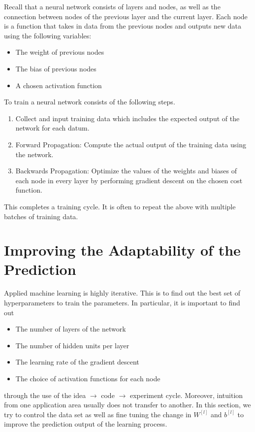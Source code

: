 \documentclass[a4paper]{article}
\begin{document}
\begin{enumerate}
Recall that a neural network consists of layers and nodes, as well as the connection between nodes of the previous layer and the current layer. Each node is a function that takes in data from the previous nodes and outputs new data using the following variables: 
\begin{itemize}
\item The weight of previous nodes
\item The bias of previous nodes
\item A chosen activation function
\end{itemize}
To train a neural network consists of the following steps. 
\begin{enumerate}
\item Collect and input training data which includes the expected output of the network for each datum. 
\item Forward Propagation: Compute the actual output of the training data using the network. 
\item Backwards Propagation: Optimize the values of the weights and biases of each node in every layer by performing gradient descent on the chosen cost function. 
\end{enumerate}

This completes a training cycle. It is often to repeat the above with multiple batches of training data. 

\pagebreak
\section{Improving the Adaptability of the Prediction}
Applied machine learning is highly iterative. This is to find out the best set of hyperparameters to train the parameters. In particular, it is important to find out 
\begin{itemize}
\item The number of layers of the network
\item The number of hidden units per layer
\item The learning rate of the gradient descent
\item The choice of activation functions for each node
\end{itemize}
through the use of the idea $\to$ code $\to$ experiment cycle. Moreover, intuition from one application area usually does not transfer to another. In this section, we try to control the data set as well as fine tuning the change in $W^{[l]}$ and $b^{[l]}$ to improve the prediction output of the learning process. 


\end{enumerate}
\end{document}
